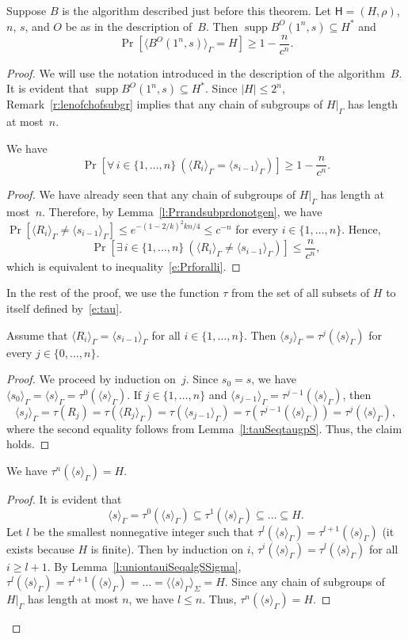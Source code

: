 \documentclass{jgcc}
\DeclareMathOperator{\supp}{supp}
\newcommand{\bb}{\mathsf}
\newcommand{\Add}[1]{#1|_\Gamma}
\newcommand{\alg}[1]{\langle#1\rangle}
\newcommand{\gp}[1]{\langle#1\rangle_\Gamma}
\newcommand{\acl}[1]{\lvert#1\rvert}
\newcommand{\Prob}[1]{\Pr[#1]}
\newcommand{\Forall}[1]{\forall\,#1\ }
\newcommand{\Exists}[1]{\exists\,#1\ }
\begin{document}
\begin{thm}
\label{t:compgensysofaddgr}
Suppose $B$ is the algorithm described just before this
theorem. Let $\bb H=(H,\rho)$, $n$, $s$, and $O$ be as in
the description of~$B$. Then $\supp B^O(1^n,s)\subseteq H^*$
and
\begin{equation}
\label{e:PrgpBO1nseqH}
\Prob{\gp{B^O(1^n,s)}=H}\ge1-\frac n{c^n}.
\end{equation}
\end{thm}
\begin{proof}
We will use the notation introduced in the description of
the algorithm~$B$. It is evident that $\supp
B^O(1^n,s)\subseteq H^*$. Since $\acl H\le2^n$,
Remark~\ref{r:lenofchofsubgr} implies that any chain of
subgroups of $\Add H$ has length at most~$n$.

\begin{clm}
\label{cl:Prforalli}
We have
\begin{equation}
\label{e:Prforalli}
\Prob{\Forall{i\in\{1,\dots,n\}}(\gp{R_i}=\gp{s_{i-1}})}
\ge1-\frac n{c^n}.
\end{equation}
\end{clm}
\begin{proof}
We have already seen that any chain of subgroups of $\Add H$
has length at most~$n$. Therefore, by
Lemma~\ref{l:Prrandsubprdonotgen}, we have
$\Prob{\gp{R_i}\ne\gp{s_{i-1}}}\le e^{-(1-2/k)^2kn/4}\le
c^{-n}$ for every $i\in\{1,\dots,n\}$. Hence,
\[
\Prob{\Exists{i\in\{1,\dots,n\}}(\gp{R_i}\ne\gp{s_{i-1}})}
\le\frac n{c^n},
\]
which is equivalent to inequality~\eqref{e:Prforalli}.
\end{proof}

In the rest of the proof, we use the function $\tau$ from
the set of all subsets of $H$ to itself defined
by~\eqref{e:tau}.

\begin{clm}
Assume that $\gp{R_i}=\gp{s_{i-1}}$ for all
$i\in\{1,\dots,n\}$. Then $\gp{s_j}=\tau^j(\gp s)$ for every
$j\in\{0,\dots,n\}$.
\end{clm}
\begin{proof}
We proceed by induction on~$j$. Since $s_0=s$, we have
$\gp{s_0}=\gp s=\tau^0(\gp s)$. If $j\in\{1,\dots,n\}$ and
$\gp{s_{j-1}}=\tau^{j-1}(\gp s)$, then
\[
\gp{s_j}=\tau(R_j)=\tau(\gp{R_j})=\tau(\gp{s_{j-1}})
=\tau(\tau^{j-1}(\gp s))=\tau^j(\gp s),
\]
where the second equality follows from
Lemma~\ref{l:tauSeqtaugpS}. Thus, the claim holds.
\end{proof}

\begin{clm}
\label{cl:taungpseqH}
We have $\tau^n(\gp s)=H$.
\end{clm}
\begin{proof}
It is evident that
\[
\gp s=\tau^0(\gp s)\subseteq\tau^1(\gp
s)\subseteq\dots\subseteq H.
\]
Let $l$ be the smallest nonnegative integer such that
$\tau^l(\gp s)=\tau^{l+1}(\gp s)$ (it exists because $H$ is
finite). Then by induction on $i$, $\tau^i(\gp s)=\tau^l(\gp
s)$ for all $i\ge l+1$. By
Lemma~\ref{l:uniontauiSeqalgSSigma}, $\tau^l(\gp
s)=\tau^{l+1}(\gp s)=\dots=\alg{\gp s}_\Sigma=H$. Since any
chain of subgroups of $\Add H$ has length at most $n$, we
have $l\le n$. Thus, $\tau^n(\gp s)=H$.
\end{proof}


\end{proof}
\end{document}
